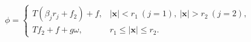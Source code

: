 $$
\phi = \begin{cases}
T \left(\beta_j r_j + f_2\right) + f, & \lvert\mathbf x\rvert<r_1\ (j=1),\ \lvert\mathbf x\rvert>r_2\ (j=2),\\
T f_2 + f + g \omega, & r_1\le\lvert\mathbf x\rvert\le r_2.
\end{cases}
$$
